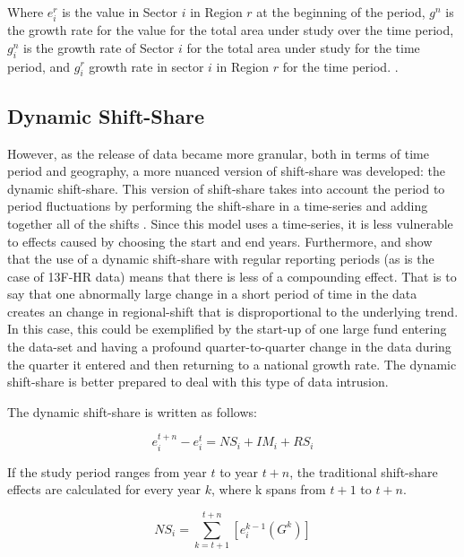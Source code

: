 Where $e^{r}_{i}$ is the value in Sector $i$ in Region $r$ at the beginning of the period, $g^{n}$ is the growth rate for the value for the total area under study over the time period, $g^{n}_{i}$ is the growth rate of Sector $i$ for the total area under study for the time period, and $g^{r}_{i}$ growth rate in sector $i$ in Region $r$ for the time period. \citep{Houston67}. 

\subsection{Dynamic Shift-Share}

However, as the release of data became more granular, both in terms of time period and geography, a more nuanced version of shift-share was developed: the dynamic shift-share.  This version of shift-share takes into account the period to period fluctuations by performing the shift-share in a time-series and adding together all of the shifts \citep{BarffKnight88}.  Since this model uses a time-series, it is less vulnerable to effects caused by choosing the start and end years. Furthermore, \cite{BarffKnight88} and \cite{harris1994dynamic} show that the use of a dynamic shift-share with regular reporting periods (as is the case of 13F-HR data) means that there is less of a compounding effect. That is to say that one abnormally large change in a short period of time in the data creates an change in regional-shift that is disproportional to the underlying trend. In this case, this could be exemplified by the start-up of one large fund entering the data-set and having a profound quarter-to-quarter change in the data during the quarter it entered and then returning to a national growth rate.  The dynamic shift-share is better prepared to deal with this type of data intrusion.  

The dynamic shift-share is written as follows:

\begin{equation}
    e^{t+n}_{i} - e^{t}_{i} = NS_{i} + IM_{i} + RS_{i}
\end{equation}

If the study period ranges from year $t$ to year $t+n$, the traditional shift-share effects are calculated for every year $k$, where k spans from $t+1$ to $t+n$. 

\begin{equation}
    NS_{i} = \sum_{k=t+1}^{t+n}[e^{k-1}_{i}(G^{k})]
    \label{Eq:NationalShare_dynamic}
\end{equation}

